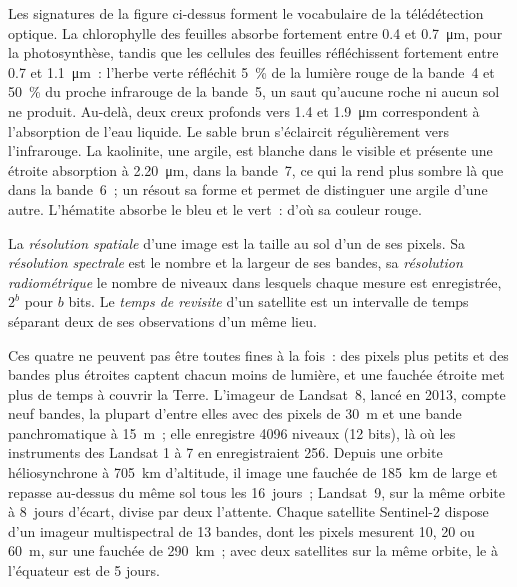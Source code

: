 Les signatures de la figure ci-dessus forment le vocabulaire de la télédétection
optique. La chlorophylle des feuilles absorbe fortement entre 0.4 et
\qty{0.7}{\micro\metre}, pour la photosynthèse, tandis que les cellules des feuilles
réfléchissent fortement entre 0.7 et \qty{1.1}{\micro\metre}~: l'herbe verte
réfléchit \qty{5}{\percent} de la lumière rouge de la bande~4 et \qty{50}{\percent}
du proche infrarouge de la bande~5, un saut qu'aucune roche ni aucun sol ne produit. Au-delà, deux
creux profonds vers 1.4 et \qty{1.9}{\micro\metre} correspondent à l'absorption de l'eau liquide.
Le sable brun s'éclaircit régulièrement vers l'infrarouge. La kaolinite, une argile, est blanche
dans le visible et présente une étroite absorption à \qty{2.20}{\micro\metre}, dans la bande~7,
ce qui la rend plus sombre là que dans la bande~6~; un  résout sa forme et
permet de distinguer une argile d'une autre. L'hématite absorbe le bleu et le vert~: d'où sa
couleur rouge.

\begin{definition}\label{def:b3:remote-sensing-gis:resolutions}
La \emph{résolution spatiale} d'une image est la
taille au sol d'un de ses pixels. Sa \emph{résolution
spectrale} est le nombre et la largeur de ses
bandes, sa \emph{résolution radiométrique} le
nombre de niveaux dans lesquels chaque mesure est enregistrée, $2^b$ pour $b$ bits.
Le \emph{temps de revisite} d'un satellite est un
intervalle de temps séparant deux de ses observations d'un même lieu.
\end{definition}

Ces quatre ne peuvent pas être toutes fines à la fois~: des pixels plus petits et des bandes plus étroites
captent chacun moins de lumière, et une fauchée étroite met plus de temps à couvrir la
Terre. L'imageur de Landsat~8, lancé en 2013, compte neuf bandes, la plupart
d'entre elles avec des pixels de \qty{30}{m} et une bande panchromatique à \qty{15}{m}~; elle
enregistre 4096 niveaux (12 bits), là où les instruments des Landsat 1 à 7
en enregistraient 256. Depuis une orbite héliosynchrone à \qty{705}{km} d'altitude, il image une
fauchée de \qty{185}{km} de large et repasse au-dessus du même sol tous les 16~jours~;
Landsat~9, sur la même orbite à 8~jours d'écart, divise par deux l'attente. Chaque
satellite Sentinel-2 dispose d'un imageur multispectral de 13 bandes, dont les pixels mesurent 10, 20
ou \qty{60}{m}, sur une fauchée de \qty{290}{km}~; avec deux satellites sur la
même orbite, le  à l'équateur est de 5 jours.


